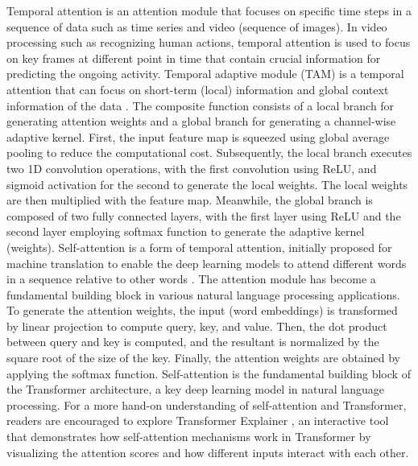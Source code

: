 \documentclass[preprint,12pt]{elsarticle}
\begin{document}
Temporal attention is an attention module that focuses on specific time steps in a sequence of data such as time series and video (sequence of images). In video processing such as recognizing human actions, temporal attention is used to focus on key frames at different point in time that contain crucial information for predicting the ongoing activity. Temporal adaptive module (TAM) is a temporal attention that can focus on short-term (local) information and global context information of the data \citep{liu_tam_2021}. The composite function consists of a local branch for generating attention weights and a global branch for generating a channel-wise adaptive kernel. First, the input feature map is squeezed using global average pooling to reduce the computational cost. Subsequently, the local branch executes two 1D convolution operations, with the first convolution using ReLU, and sigmoid activation for the second to generate the local weights. The local weights are then multiplied with the feature map. Meanwhile, the global branch is composed of two fully connected layers, with the first layer using ReLU and the second layer employing softmax function to generate the adaptive kernel (weights). Self-attention is a form of temporal attention, initially proposed for machine translation to enable the deep learning models to attend different words in a sequence relative to other words \citep{vaswani_attention_2023}. The attention module has become a fundamental building block in various natural language processing applications. To generate the attention weights, the input (word embeddings) is transformed by linear projection to compute query, key, and value. Then, the dot product between query and key is computed, and the resultant is normalized by the square root of the size of the key. Finally, the attention weights are obtained by applying the softmax function. Self-attention is the fundamental building block of the Transformer architecture, a key deep learning model in natural language processing. For a more hand-on understanding of self-attention and Transformer, readers are encouraged to explore Transformer Explainer \citep{noauthor_poloclubtransformer-explainer_2025}, an interactive tool that demonstrates how self-attention mechanisms work in Transformer by visualizing the attention scores and how different inputs interact with each other.
\end{document}
